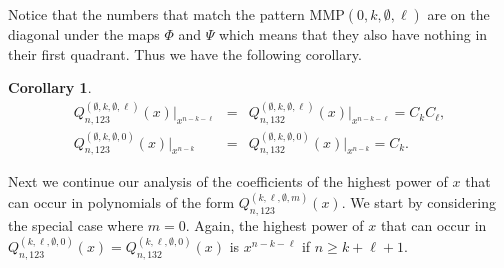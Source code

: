 \documentclass[
final,nomarks
]{dmtcs-episciences}
\newtheorem{corollary}{Corollary}
\newcommand{\Qmmn}[2]{Q_{#2,132}^{(#1)}(x)}
\newcommand{\Qmn}[2]{Q_{#2,123}^{(#1)}(x)}
\newcommand{\MMP}{\mathrm{MMP}}
\begin{document}
Notice that the numbers that match the pattern \begin{math}\MMP(0,k,\emptyset,\ell)\end{math} are on the diagonal under 
the maps \begin{math}\Phi\end{math} and \begin{math}\Psi\end{math} which means that they also have nothing in their first quadrant. Thus we have the following corollary.
\begin{corollary}\label{corollary:05}
\begin{eqnarray}
\Qmn{\emptyset,k,\emptyset,\ell}{n}\big\vert_{x^{n-k-\ell}}&=&\Qmmn{\emptyset,k,\emptyset,\ell}{n}\big\vert_{x^{n-k-\ell}}=C_k C_\ell,\\
\Qmn{\emptyset,k,\emptyset,0}{n}\big\vert_{x^{n-k}}&=&\Qmmn{\emptyset,k,\emptyset,0}{n}\big\vert_{x^{n-k}}=C_k.
\end{eqnarray}
\end{corollary}


Next we continue our analysis of the coefficients of the highest 
power of \begin{math}x\end{math} that can occur in polynomials of the form 
\begin{math}\Qmn{k,\ell,\emptyset,m}{n}\end{math}. We start by considering the special case where 
\begin{math}m=0\end{math}. Again, the highest power of \begin{math}x\end{math} that can occur in 
\begin{math}\Qmn{k,\ell,\emptyset,0}{n} =\Qmmn{k,\ell,\emptyset,0}{n}\end{math} is \begin{math}x^{n-k-\ell}\end{math} if 
\begin{math}n \geq k + \ell +1\end{math}.
\end{document}
